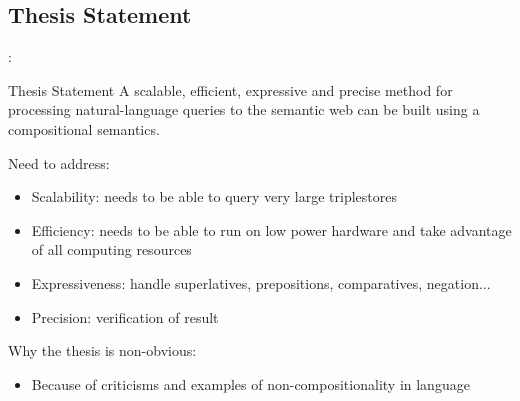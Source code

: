 \documentclass[logoontitle,tabu,supertabular,aspectratio=43]{preney-uwindsor-beamer}
\begin{document}

    \subsection{Thesis Statement}
    \begin{frame}{\insertsection: \insertsubsection}
        \begin{block}{Thesis Statement}
            A scalable, efficient, expressive and precise method for processing natural-language queries to the semantic web can be built using a compositional semantics.
        \end{block}

        Need to address:
        \begin{itemize}
            \item Scalability: needs to be able to query very large triplestores
            \item Efficiency: needs to be able to run on low power hardware and take advantage of all computing resources
            \item Expressiveness: handle superlatives, prepositions, comparatives, negation...
            \item Precision: verification of result
        \end{itemize}

        Why the thesis is non-obvious:
        \begin{itemize}
            \item Because of criticisms and examples of non-compositionality in language
        \end{itemize}
    \end{frame}

\end{document}
